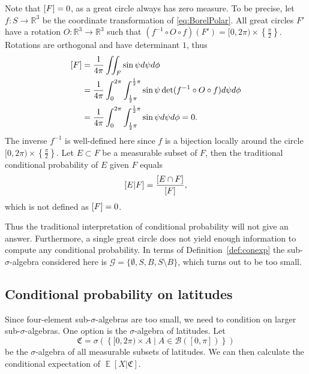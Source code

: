 \documentclass[a4paper]{report}
\theoremstyle{plain}
\theoremstyle{definition}
\theoremstyle{remark}
\numberwithin{equation}{chapter}
\newcommand{\R}{\mathbb{R}}
\let\P\relax
\DeclareMathOperator{\P}{\mathbb{P}}
\DeclareMathOperator{\E}{\mathbb{E}}
\DeclareMathOperator{\1}{\mathbbm{1}}
\renewcommand{\G}{\mathcal{G}}
\newcommand{\B}{\mathcal{B}}
\begin{document}
Note that $\P[F]=0$, as a great circle always has zero measure. To be precise, let $f\colon S\to\R^3$ be the coordinate transformation of \eqref{eq:BorelPolar}. All great circles $F'$ have a rotation $O\colon\R^3\to\R^3$ such that $(f^{-1}\circ O\circ f)(F')=[0,2\pi)\times\left\{\frac{\pi}{2}\right\}$. Rotations are orthogonal and have determinant $1$, thus
\begin{align}
\P[F]&=\frac{1}{4\pi}\iint_F\sin\psi d\psi d\phi\\
&=\frac{1}{4\pi}\int_0^{2\pi}\int_{\frac{1}{2}\pi}^{\frac{1}{2}\pi}\sin\psi \det(f^{-1}\circ O\circ f)d\psi d\phi\\
&=\frac{1}{4\pi}\int_0^{2\pi}\int_{\frac{1}{2}\pi}^{\frac{1}{2}\pi}\sin\psi d\psi d\phi=0.
\end{align}
The inverse $f^{-1}$ is well-defined here since $f$ is a bijection locally around the circle $[0,2\pi)\times\left\{\frac{\pi}{2}\right\}$. Let $E\subset F$ be a measurable subset of $F$, then the traditional conditional probability of $E$ given $F$ equals
\begin{equation}
\P[E|F]=\frac{\P[E\cap F]}{\P[F]},
\end{equation}
which is not defined as $\P[F]=0$.

Thus the traditional interpretation of conditional probability will not give an answer. Furthermore, a single great circle does not yield enough information to compute any conditional probability. In terms of Definition~\ref{def:conexp} the sub-$\sigma$-algebra considered here is $\G=\{\emptyset,S,B,S\setminus B\}$, which turns out to be too small.

\subsection{Conditional probability on latitudes}\label{sec:BorelLong}
Since four-element sub-$\sigma$-algebras are too small, we need to condition on larger sub-$\sigma$-algebras. One option is the $\sigma$-algebra of latitudes. Let
\begin{equation}
\mathfrak{C}=\sigma\left(\left\{[0,2\pi)\times A\mid A\in\B([0,\pi])\right\}\right)
\end{equation}
be the $\sigma$-algebra of all measurable subsets of latitudes. We can then calculate the conditional expectation of $\E[X|\mathfrak{C}]$.
\end{document}
